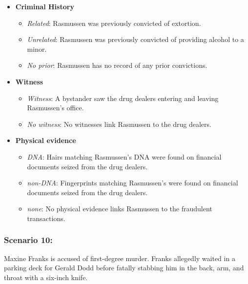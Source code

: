 \documentclass[
]{article}
\providecommand{\tightlist}{%
  \setlength{\itemsep}{0pt}\setlength{\parskip}{0pt}}
\begin{document}
\begin{itemize}
\tightlist
\item
  \textbf{Criminal History}

  \begin{itemize}
  \tightlist
  \item
    \emph{Related}: Rasmussen was previously convicted of extortion.
  \item
    \emph{Unrelated}: Rasmussen was previously convicted of providing
    alcohol to a minor.
  \item
    \emph{No prior}: Rasmussen has no record of any prior convictions.
  \end{itemize}
\item
  \textbf{Witness}

  \begin{itemize}
  \tightlist
  \item
    \emph{Witness}: A bystander saw the drug dealers entering and
    leaving Rasmussen's office.
  \item
    \emph{No witness}: No witnesses link Rasmussen to the drug dealers.
  \end{itemize}
\item
  \textbf{Physical evidence}

  \begin{itemize}
  \tightlist
  \item
    \emph{DNA}: Hairs matching Rasmussen's DNA were found on financial
    documents seized from the drug dealers.
  \item
    \emph{non-DNA}: Fingerprints matching Rasmussen's were found on
    financial documents seized from the drug dealers.
  \item
    \emph{none}: No physical evidence links Rasmussen to the fraudulent
    transactions.
  \end{itemize}
\end{itemize}

\hypertarget{scenario-10}{%
\subsubsection{Scenario 10:}\label{scenario-10}}

Maxine Franks is accused of first-degree murder. Franks allegedly waited
in a parking deck for Gerald Dodd before fatally stabbing him in the
back, arm, and throat with a six-inch knife.
\end{document}
